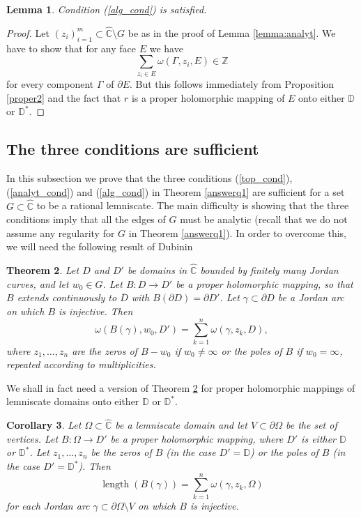 \documentclass{amsart}
\theoremstyle{plain}
\newtheorem{theorem}{Theorem}[section]
\newtheorem{lemma}[theorem]{Lemma}
\newtheorem{corollary}[theorem]{Corollary}
\theoremstyle{definition}
\theoremstyle{remark}
\newcommand{\mD}{\mathbb{D}}
\newcommand{\hC}{\widehat{\mathbb{C}}}
\begin{document}
\begin{lemma}
Condition \emph{(\ref{alg_cond})} is satisfied.
\end{lemma}

\begin{proof}
Let $(z_i)_{i=1}^m \subset \hC \setminus G$ be as in the proof of Lemma \ref{lemma:analyt}. We have to show that for any face $E$ we have
$$\sum_{z_i \in E} \omega(\Gamma, z_i, E) \in \mathbb{Z}$$
for every component $\Gamma$ of $\partial E$. But this follows immediately from Proposition \ref{proper2} and the fact that $r$ is a proper holomorphic mapping of $E$ onto either $\mD$ or $\mD^*$.
\end{proof}


\subsection{The three conditions are sufficient}

In this subsection we prove that the three conditions (\ref{top_cond}), (\ref{analyt_cond}) and (\ref{alg_cond}) in Theorem \ref{answerq1} are sufficient for a set $G \subset \hC$ to be a rational lemniscate. The main difficulty is showing that the three conditions imply that all the edges of $G$ must be analytic (recall that we do not assume any regularity for $G$ in Theorem \ref{answerq1}). In order to overcome this, we will need the following result of Dubinin \cite[Theorem 2]{Dubinin2008}

\begin{theorem}
\label{dubinin}
Let $D$ and $D'$ be domains in $\hC$ bounded by finitely many Jordan curves, and let $w_0 \in G$. Let $B:D \to D'$ be a proper holomorphic mapping, so that $B$ extends continuously to $\overline{D}$ with $B(\partial D) = \partial D'$. Let $\gamma \subset \partial D$ be a Jordan arc on which $B$ is injective. Then
$$\omega(B(\gamma),w_0,D') = \sum_{k=1}^n \omega(\gamma,z_k,D),$$
where $z_1, \dots, z_n$ are the zeros of $B-w_0$ if $w_0 \neq \infty$ or the poles of $B$ if $w_0 = \infty$, repeated according to multiplicities.
\end{theorem}

We shall in fact need a version of Theorem \ref{dubinin} for proper holomorphic mappings of lemniscate domains onto either $\mD$ or $\mD^*$.

\begin{corollary}
\label{corollarylength}
Let $\Omega \subset \hC$ be a lemniscate domain and let $V \subset \partial \Omega$ be the set of vertices. Let $B:\Omega \to D'$ be a proper holomorphic mapping, where $D'$ is either $\mD$ or $\mD^*$. Let $z_1, \dots, z_n$ be the zeros of $B$ (in the case $D'=\mD$) or the poles of $B$ (in the case $D'=\mD^*$). Then
$$
\operatorname{length}(B(\gamma))=\sum_{k=1}^n \omega(\gamma,z_k,\Omega)
$$
for each Jordan arc $\gamma \subset \partial \Omega \setminus V$ on which $B$ is injective.
\end{corollary}
\end{document}
